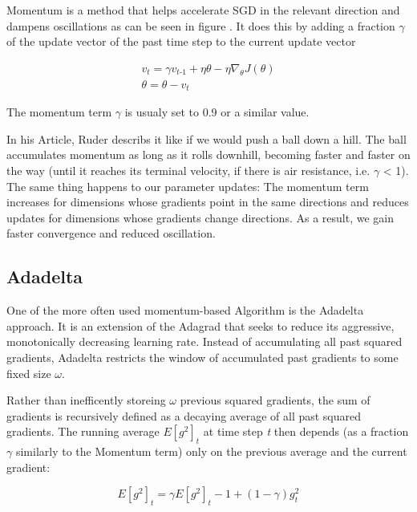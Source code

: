 \documentclass[12pt,oneside,a4paper,parskip]{scrbook}
\begin{document}
Momentum \cite{QIAN1999145, Ruder2016AnOO} is a method that helps accelerate SGD in the relevant direction and dampens
oscillations as can be seen in figure . It does this by adding a fraction $\gamma $ of the update vector of the past time step to the
current update vector

\begin{equation}
\begin{split}
\textit{v}_\textit{t} = \gamma\textit{v}_\textit{t-1} + \eta \theta - \eta\nabla_\theta \textit{J}(\theta) \\
\theta = \theta - \textit{v}_\textit{t}
\end{split}
\end{equation}

The momentum term $\gamma $ is usualy set to 0.9 or a similar value.

In his Article, Ruder \cite{overvieDiffRSLVQ} describs it like if we would push a ball down a hill. 
The ball accumulates momentum as long as it rolls downhill, becoming faster and faster on the way 
(until it reaches its terminal velocity, if there is air resistance, i.e. $\gamma $ < 1). 
The same thing happens to our parameter updates: The momentum term increases for dimensions whose gradients
point in the same directions and reduces updates for dimensions whose gradients change directions.
As a result, we gain faster convergence and reduced oscillation.

\subsection{Adadelta}
One of the more often used momentum-based Algorithm is the Adadelta approach. It is an extension of the Adagrad \cite{Zeiler2012ADADELTAAA} that 
seeks to reduce its aggressive, monotonically decreasing learning rate. Instead of accumulating all past squared gradients, 
Adadelta restricts the window of accumulated past gradients to some fixed size $\omega$.  

Rather than inefficently storeing $\omega$ previous squared gradients, the sum of gradients is recursively defined as a 
decaying average of all past squared gradients. The running average $\textit{E}[\textit{g}^2]_t$  at time step \textit{t} 
then depends (as a fraction $\gamma $ similarly to the Momentum term) only on the previous average and the 
current gradient:

\begin{equation}
\textit{E}[\textit{g}^2]_t = \gamma\textit{E}[\textit{g}^2]_t-1 + (1-\gamma)\textit{g}^2_t
\end{equation}
\end{document}
